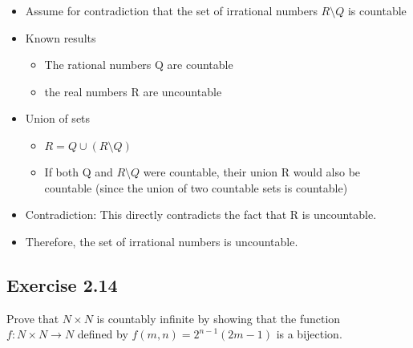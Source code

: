 \documentclass[12pt]{article}
\begin{document}
			\begin{itemize}
				\item Assume for contradiction that the set of irrational numbers $R \setminus Q$ is countable
				\item Known results
					\begin{itemize}
						\item The rational numbers Q are countable
						\item the real numbers R are uncountable
					\end{itemize}
				\item Union of sets
					\begin{itemize}
						\item $R = Q \cup (R \setminus Q)$
						\item If both Q and $R \setminus Q$ were countable, their union R would also be countable (since the union of two countable sets is countable)
					\end{itemize}
				\item Contradiction: This directly contradicts the fact that R is uncountable.
				\item Therefore, the set of irrational numbers is uncountable.
			\end{itemize}
		\subsection*{Exercise 2.14}
			Prove that $N \times N$ is countably infinite by showing that the function $f: N \times N \rightarrow N$ defined by $f(m,n) = 2^{n-1}(2m-1)$ is a bijection.
			
\end{document}
